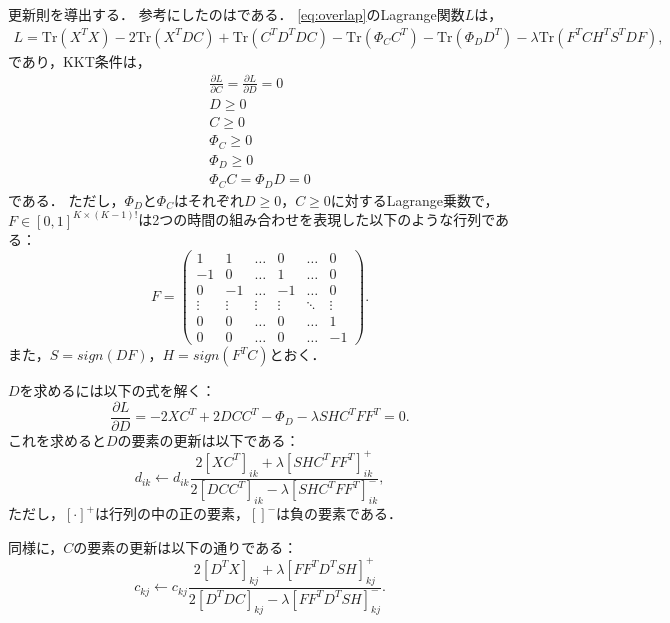 更新則を導出する．
参考にしたのは\cite{Babaee2016}である．
\eqref{eq:overlap}のLagrange関数$L$は，
\begin{align}
	L = \text{Tr}(X^TX) - 2 \text{Tr}(X^TDC) + \text{Tr}(C^TD^TDC) - \text{Tr}(\Phi_C C^T) - \text{Tr}(\Phi_D D^T) - \lambda \text{Tr} (F^T C H^T S^T D F),
\end{align}
であり，KKT条件は，
\begin{align}
	\frac{\partial L}{\partial C} = \frac{\partial L}{\partial D} = 0 \\
	D \geq 0 \\
	C \geq 0 \\
	\Phi_C \geq 0 \\
	\Phi_D \geq 0 \\
	\Phi_C C = \Phi_D D = 0
\end{align}
である．
ただし，$\Phi_D$と$\Phi_C$はそれぞれ$D \geq 0$，$C \geq 0$に対するLagrange乗数で，$F \in [0,1]^{K \times (K-1)!}$は2つの時間の組み合わせを表現した以下のような行列である：
\begin{equation}
	F = \left(
    \begin{array}{cccccc}
			1 & 1 & \ldots & 0 & \ldots & 0 \\
			-1 & 0 & \ldots & 1 & \ldots & 0 \\
			0 & -1 & \ldots & -1 & \ldots & 0 \\
			\vdots & \vdots & \vdots & \vdots & \ddots & \vdots \\
			0 & 0 & \ldots & 0 & \ldots & 1 \\
			0 & 0 & \ldots & 0 & \ldots & -1
    \end{array}
  \right).
\end{equation}
また，$S = sign(DF)$，$H = sign(F^TC)$とおく．

$D$を求めるには以下の式を解く：
\begin{equation}
	\frac{\partial L}{\partial D} = - 2 X C^T + 2 DCC^T - \Phi_D - \lambda SHC^T FF^T = 0.
\end{equation}
これを求めると$D$の要素の更新は以下である：
\begin{equation}
	d_{ik} \leftarrow d_{ik} \frac{2[XC^T]_{ik} + \lambda [SHC^T FF^T]_{ik}^+}{2[DCC^T]_{ik} - \lambda [SHC^T FF^T]_{ik}^-},
\end{equation}
ただし，$[\cdot]^+$は行列の中の正の要素，$[]^-$は負の要素である．

同様に，$C$の要素の更新は以下の通りである：
\begin{equation}
	c_{kj} \leftarrow c_{kj} \frac{2[D^T X]_{kj} + \lambda [FF^T D^T SH]_{kj}^+}{2[D^T DC]_{kj} - \lambda [FF^T D^T SH]_{kj}^-}.
\end{equation}

